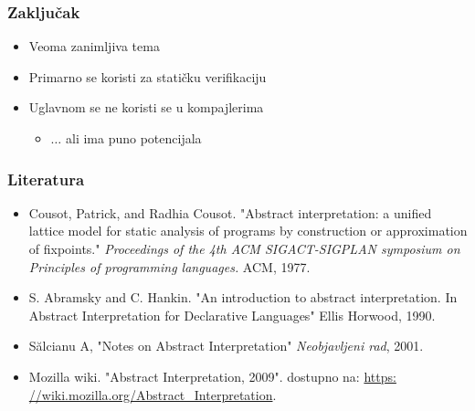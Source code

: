 \documentclass[xetex,mathserif,serif]{beamer}
\begin{document}
  \begin{frame}
    \frametitle{Zaklju\v cak}
	\begin{center}
		\begin{itemize}
 			\item Veoma zanimljiva tema \pause
			\item Primarno se koristi za stati\v cku verifikaciju \pause
			\item Uglavnom se ne koristi se u kompajlerima \pause
			\begin{itemize}
				\item $\dots$ {\color{green} ali ima puno potencijala}
			\end{itemize}
			
		\end{itemize}
	\end{center}
  \end{frame}
    \begin{frame}
    \frametitle{Literatura}
	\begin{center}
			\begin{itemize}
			\item
				Cousot, Patrick, and Radhia Cousot.
				"Abstract interpretation: a unified lattice model for static analysis of programs by construction or approximation of fixpoints."
				\emph{Proceedings of the 4th ACM SIGACT-SIGPLAN symposium on Principles of programming languages.}
				ACM, 1977.
			\item 
				S. Abramsky and C. Hankin.
				"An introduction to abstract interpretation. In Abstract Interpretation for Declarative Languages"
				 Ellis Horwood, 1990.
			\item
				Sălcianu A,
				"Notes on Abstract Interpretation" \emph{Neobjavljeni rad}, 2001.
			\item 
				Mozilla wiki. "Abstract Interpretation, 2009". dostupno na: \url{https:
//wiki.mozilla.org/Abstract_Interpretation}.

  		\end{itemize}
	\end{center}
  \end{frame}
\end{document}
